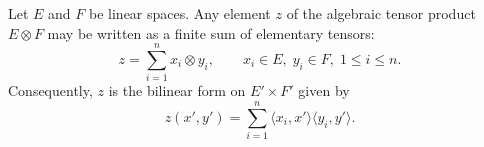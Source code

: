 Let $E$ and $F$ be linear spaces. Any element $z$ of the algebraic tensor product $E \otimes F$ may be written as a finite sum of elementary tensors:
$$z = \sum_{i=1}^{n} x_i \otimes y_i, \qquad x_i \in E,\; y_i \in F,\; 1 \leq i \leq n.$$
Consequently, $z$ is the bilinear form on $E' \times F'$ given by
$$z(x', y') = \sum_{i=1}^{n} \langle x_i, x' \rangle \langle y_i, y' \rangle.$$

